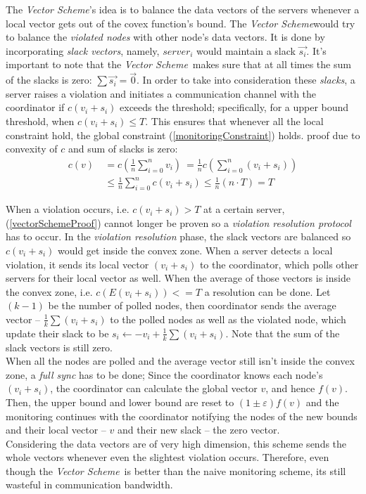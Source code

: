 \documentclass[10pt, conference]{IEEEtran}
\newcommand{\vectorScheme}{\textit{Vector Scheme}}
\begin{document}
The \vectorScheme 's idea is to balance the data vectors of the servers whenever a local vector gets out of the covex function's bound. The \vectorScheme would try to balance the \textit{violated nodes} with other node's data vectors. It is done by incorporating \textit{slack vectors}, namely, $server_i$ would maintain a slack $\overrightarrow{s_i}$. It's important to note that the \vectorScheme \  makes sure that at all times the sum of the slacks is zero: $\sum{\overrightarrow{s_i}} = \textstyle \overrightarrow{0}$.
In order to take into consideration these \textit{slacks}, a server raises a violation and initiates a communication channel with the coordinator if $c(v_i+s_i)$ exceeds the threshold; specifically, for a upper bound threshold, when $c(v_i+s_i) \leq T$. This ensures that whenever all the local constraint hold, the global constraint (\ref{monitoringConstraint}) holds. proof due to convexity of $c$ and sum of slacks is zero:
\begin{equation}
\label{vectorSchemeProof}
\begin{aligned}
 c(v)  \
	   &=  c\left(\frac{1}{n} \sum\limits_{i=0}^{n}{v_i}\right)  \
        =  \frac{1}{n} c\left(\sum\limits_{i=0}^{n}{(v_i + s_i)}\right) \\
      &\leq   \frac{1}{n} \sum\limits_{i=0}^{n}{c(v_i + s_i)}
       \leq   \frac{1}{n}(n \cdot T)
       = T
\end{aligned}
\end{equation}

When a violation occurs, i.e. $c(v_i+s_i) > T$ at a certain server, (\ref{vectorSchemeProof}) cannot longer be proven so a \textit{violation resolution protocol} has to occur. In the \textit{violation resolution} phase, the slack vectors are balanced so $c(v_i+s_i)$ would get inside the convex zone. When a server detects a local violation, it sends its local vector $(v_i + s_i)$ to the coordinator, which polls other servers for their local vector as well. When the average of those vectors is inside the convex zone, i.e. $c(E(v_i + s_i)) <= T$ a resolution can be done. Let $(k-1)$ be the number of polled nodes, then coordinator sends the average vector -- $\frac{1}{k}\sum{(v_i + s_i)}$ to the polled nodes as well as the violated node, which update their slack to be $s_i \leftarrow -v_i + \frac{1}{k}\sum{(v_i + s_i)} $. Note that the sum of the slack vectors is still zero. \\
When all the nodes are polled and the average vector still isn't inside the convex zone, a \textit{full sync} has to be done; Since the coordinator knows each node's $(v_i + s_i)$, the coordinator can calculate the global vector $v$, and hence $f(v)$. Then, the upper bound and lower bound are reset to $(1 \pm \varepsilon )f(v)$ and the monitoring continues with the coordinator notifying the nodes of the new bounds and their local vector -- $v$ and their new slack -- the zero vector. \\
Considering the data vectors are of very high dimension, this scheme sends the whole vectors whenever even the slightest violation occurs. Therefore, even though the \vectorScheme \  is better than the naive monitoring scheme, its still wasteful in communication bandwidth.
\end{document}

